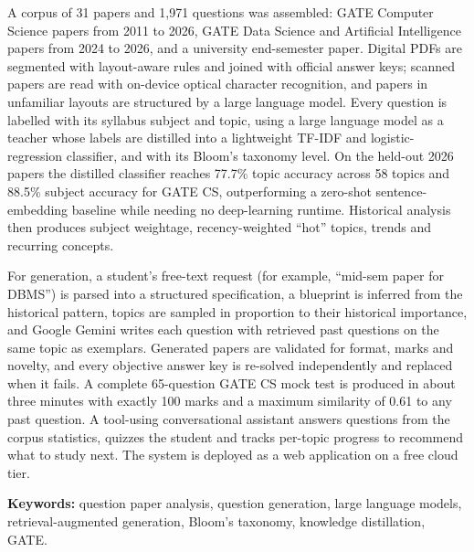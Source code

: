 \documentclass[12pt,a4paper,twoside,openright]{report}
\begin{document}
A corpus of 31 papers and 1,971 questions was assembled: GATE Computer Science papers from 2011 to 2026, GATE Data
Science and Artificial Intelligence papers from 2024 to 2026, and a university end-semester paper. Digital PDFs are
segmented with layout-aware rules and joined with official answer keys; scanned papers are read with on-device optical
character recognition, and papers in unfamiliar layouts are structured by a large language model. Every question is
labelled with its syllabus subject and topic, using a large language model as a teacher whose labels are distilled into
a lightweight TF-IDF and logistic-regression classifier, and with its Bloom's taxonomy level. On the held-out 2026
papers the distilled classifier reaches 77.7\% topic accuracy across 58 topics and 88.5\% subject accuracy for GATE CS,
outperforming a zero-shot sentence-embedding baseline while needing no deep-learning runtime. Historical analysis then
produces subject weightage, recency-weighted ``hot'' topics, trends and recurring concepts.

For generation, a student's free-text request (for example, ``mid-sem paper for DBMS'') is parsed into a structured
specification, a blueprint is inferred from the historical pattern, topics are sampled in proportion to their
historical importance, and Google Gemini writes each question with retrieved past questions on the same topic as
exemplars. Generated papers are validated for format, marks and novelty, and every objective answer key is re-solved
independently and replaced when it fails. A complete 65-question GATE CS mock test is produced in about three minutes
with exactly 100 marks and a maximum similarity of 0.61 to any past question. A tool-using conversational assistant
answers questions from the corpus statistics, quizzes the student and tracks per-topic progress to recommend what to
study next. The system is deployed as a web application on a free cloud tier.

\vspace{0.4cm}
\noindent\textbf{Keywords:} question paper analysis, question generation, large language models, retrieval-augmented
generation, Bloom's taxonomy, knowledge distillation, GATE.
\endgroup
\cleardoublepage
\makeatletter\@openrighttrue\makeatother   %






\cleardoublepage
{}


\appendix

\end{document}
